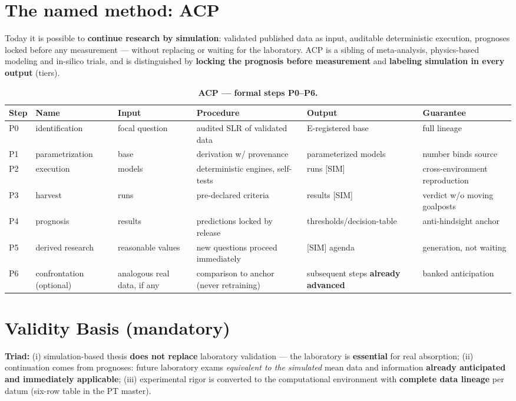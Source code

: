 \documentclass[10pt,twocolumn]{article}
\begin{document}
\section{The named method: ACP}
Today it is possible to \textbf{continue research by simulation}: validated published data as input, auditable deterministic execution, prognoses locked before any measurement — without replacing or waiting for the laboratory. ACP is a sibling of meta-analysis, physics-based modeling and in-silico trials, and is distinguished by \textbf{locking the prognosis before measurement} and \textbf{labeling simulation in every output} (tiers).
\begin{table}[t]\centering\small
\caption{\textbf{ACP — formal steps P0--P6.}}
\begin{tabular}{llllp{5.2cm}l}
\toprule
Step & Name & Input & Procedure & Output & Guarantee \\
\midrule
P0 & identification & focal question & audited SLR of validated data & E-registered base & full lineage \\
P1 & parametrization & base & derivation w/ provenance & parameterized models & number binds source \\
P2 & execution & models & deterministic engines, self-tests & runs [SIM] & cross-environment reproduction \\
P3 & harvest & runs & pre-declared criteria & results [SIM] & verdict w/o moving goalposts \\
P4 & prognosis & results & predictions locked by release & thresholds/decision-table & anti-hindsight anchor \\
P5 & derived research & reasonable values & new questions proceed immediately & [SIM] agenda & generation, not waiting \\
P6 & confrontation (optional) & analogous real data, if any & comparison to anchor (never retraining) & subsequent steps \textbf{already advanced} & banked anticipation \\
\bottomrule
\end{tabular}
\end{table}
\section{Validity Basis (mandatory)}
\textbf{Triad:} (i) simulation-based thesis \textbf{does not replace} laboratory validation — the laboratory is \textbf{essential} for real absorption; (ii) continuation comes from prognoses: future laboratory exams \emph{equivalent to the simulated} mean data and information \textbf{already anticipated and immediately applicable}; (iii) experimental rigor is converted to the computational environment with \textbf{complete data lineage} per datum (six-row table in the PT master).
\end{document}
